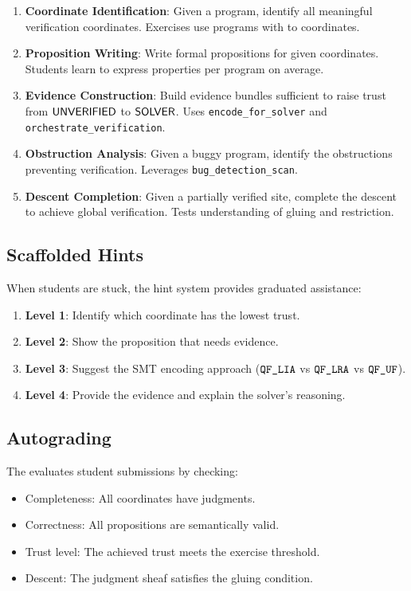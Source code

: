 \documentclass[11pt]{article}
\newcommand{\Autograder}{\mathsf{AUTOGRADER}}
\begin{document}
\begin{enumerate}[leftmargin=*]
  \item \textbf{Coordinate Identification}: Given a program, identify
        all meaningful verification coordinates. Exercises use programs
        with \expCoordsMin{} to \expCoordsMax{} coordinates.
  \item \textbf{Proposition Writing}: Write formal propositions for given
        coordinates. Students learn to express \expPropsMean{} properties
        per program on average.
  \item \textbf{Evidence Construction}: Build evidence bundles sufficient
        to raise trust from $\mathsf{UNVERIFIED}$ to $\mathsf{SOLVER}$. Uses
        \texttt{encode\_for\_solver} and \texttt{orchestrate\_verification}.
  \item \textbf{Obstruction Analysis}: Given a buggy program, identify
        the obstructions preventing verification. Leverages
        \texttt{bug\_detection\_scan}.
  \item \textbf{Descent Completion}: Given a partially verified site, complete
        the descent to achieve global verification. Tests understanding of
        gluing and restriction.
\end{enumerate}

\subsection{Scaffolded Hints}

When students are stuck, the hint system provides graduated assistance:

\begin{enumerate}
  \item \textbf{Level 1}: Identify which coordinate has the lowest trust.
  \item \textbf{Level 2}: Show the proposition that needs evidence.
  \item \textbf{Level 3}: Suggest the SMT encoding approach
        ($\texttt{QF\_LIA}$ vs $\texttt{QF\_LRA}$ vs $\texttt{QF\_UF}$).
  \item \textbf{Level 4}: Provide the evidence and explain the solver's
        reasoning.
\end{enumerate}

\subsection{Autograding}

The \Autograder{} evaluates student submissions by checking:
\begin{itemize}
  \item Completeness: All coordinates have judgments.
  \item Correctness: All propositions are semantically valid.
  \item Trust level: The achieved trust meets the exercise threshold.
  \item Descent: The judgment sheaf satisfies the gluing condition.
\end{itemize}
\end{document}
